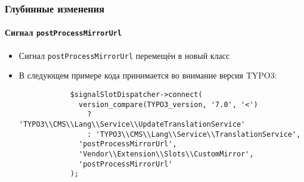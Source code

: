 \begin{frame}[fragile]
	\frametitle{Глубинные изменения}
	\framesubtitle{Сигнал \texttt{postProcessMirrorUrl}}

	\lstset{basicstyle=\tiny\ttfamily}

	\begin{itemize}

		\item Сигнал \texttt{postProcessMirrorUrl} перемещён в новый класс

		\breakingchange

		\item В следующем примере кода принимается во внимание версия TYPO3:

		\begin{lstlisting}
			$signalSlotDispatcher->connect(
			  version_compare(TYPO3_version, '7.0', '<')
			    ? 'TYPO3\\CMS\\Lang\\Service\\UpdateTranslationService'
			    : 'TYPO3\\CMS\\Lang\\Service\\TranslationService',
			  'postProcessMirrorUrl',
			  'Vendor\\Extension\\Slots\\CustomMirror',
			  'postProcessMirrorUrl'
			);
		\end{lstlisting}

	\end{itemize}

\end{frame}


